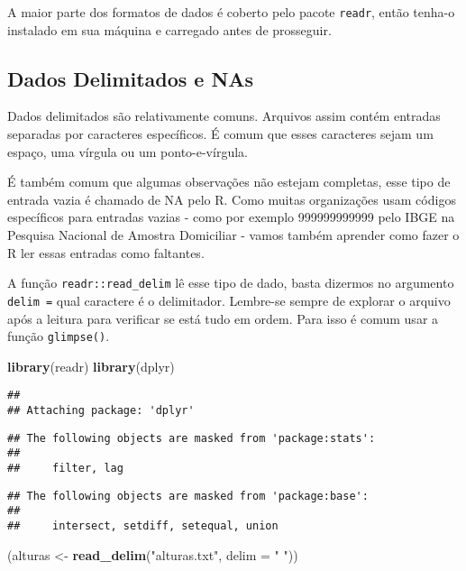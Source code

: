 \documentclass[
]{article}
\newenvironment{Shaded}{\begin{snugshade}}{\end{snugshade}}
\newcommand{\DataTypeTok}[1]{\textcolor[rgb]{0.13,0.29,0.53}{#1}}
\newcommand{\KeywordTok}[1]{\textcolor[rgb]{0.13,0.29,0.53}{\textbf{#1}}}
\newcommand{\NormalTok}[1]{#1}
\newcommand{\StringTok}[1]{\textcolor[rgb]{0.31,0.60,0.02}{#1}}
\begin{document}
A maior parte dos formatos de dados é coberto pelo pacote
\texttt{readr}, então tenha-o instalado em sua máquina e carregado antes
de prosseguir.

\hypertarget{dados-delimitados-e-nas}{%
\subsection{Dados Delimitados e NAs}\label{dados-delimitados-e-nas}}

Dados delimitados são relativamente comuns. Arquivos assim contém
entradas separadas por caracteres específicos. É comum que esses
caracteres sejam um espaço, uma vírgula ou um ponto-e-vírgula.

É também comum que algumas observações não estejam completas, esse tipo
de entrada vazia é chamado de NA pelo R. Como muitas organizações usam
códigos específicos para entradas vazias - como por exemplo 999999999999
pelo IBGE na Pesquisa Nacional de Amostra Domiciliar - vamos também
aprender como fazer o R ler essas entradas como faltantes.

A função \texttt{readr::read\_delim} lê esse tipo de dado, basta
dizermos no argumento \texttt{delim\ =} qual caractere é o delimitador.
Lembre-se sempre de explorar o arquivo após a leitura para verificar se
está tudo em ordem. Para isso é comum usar a função \texttt{glimpse()}.

\begin{Shaded}
\begin{Highlighting}[]
\KeywordTok{library}\NormalTok{(readr)}
\KeywordTok{library}\NormalTok{(dplyr)}
\end{Highlighting}
\end{Shaded}

\begin{verbatim}
## 
## Attaching package: 'dplyr'
\end{verbatim}

\begin{verbatim}
## The following objects are masked from 'package:stats':
## 
##     filter, lag
\end{verbatim}

\begin{verbatim}
## The following objects are masked from 'package:base':
## 
##     intersect, setdiff, setequal, union
\end{verbatim}

\begin{Shaded}
\begin{Highlighting}[]
\NormalTok{(alturas <-}\StringTok{ }\KeywordTok{read_delim}\NormalTok{(}\StringTok{"alturas.txt"}\NormalTok{, }
                     \DataTypeTok{delim =} \StringTok{" "}\NormalTok{))}
\end{Highlighting}
\end{Shaded}
\end{document}
